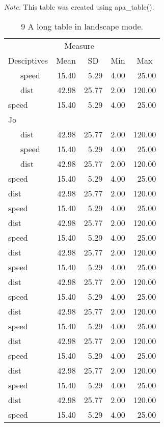 \documentclass[english,man]{apa6}
\makeatletter
\newenvironment{lltable}
  {\begin{landscape}\begin{center}\begin{ThreePartTable}}
  {\end{ThreePartTable}\end{center}\end{landscape}}
\newcommand\LastLTentrywidth{1em}
\newlength\longtablewidth
\newcommand\getlongtablewidth{%
 \begingroup
  \ifcsname LT@\roman{LT@tables}\endcsname
  \global\longtablewidth=0pt
  \renewcommand\LT@entry[2]{\global\advance\longtablewidth by ##2\relax\gdef\LastLTentrywidth{##2}}%
  \@nameuse{LT@\roman{LT@tables}}%
  \fi
\endgroup}
\theoremstyle{definition}
\theoremstyle{definition}
\theoremstyle{definition}
\theoremstyle{remark}
\makeatother
\begin{document}
\begin{lltable}
\begin{TableNotes}[para]
\textit{Note.} This table was created using apa\_table().
\end{TableNotes}
\begin{longtable}{lrrlr}\noalign{\getlongtablewidth\global\LTcapwidth=\longtablewidth}
\caption{\label{tab:unnamed-chunk-8}9 A long table in landscape mode.}\\
\toprule
 & \multicolumn{2}{c}{Measure}  &  &\\
\cmidrule(r){2-3}
Desciptives & \multicolumn{1}{c}{Mean} & \multicolumn{1}{c}{SD} & \multicolumn{1}{c}{Min} & \multicolumn{1}{c}{Max}\\
\midrule
\ \ \ speed & 15.40 & 5.29 & 4.00 & 25.00\\
\ \ \ dist & 42.98 & 25.77 & 2.00 & 120.00\\
speed & 15.40 & 5.29 & 4.00 & 25.00\\
Jo &  &  &  & \\ \midrule
\ \ \ dist & 42.98 & 25.77 & 2.00 & 120.00\\
\ \ \ speed & 15.40 & 5.29 & 4.00 & 25.00\\
\ \ \ dist & 42.98 & 25.77 & 2.00 & 120.00\\
speed & 15.40 & 5.29 & 4.00 & 25.00\\
dist & 42.98 & 25.77 & 2.00 & 120.00\\
speed & 15.40 & 5.29 & 4.00 & 25.00\\
dist & 42.98 & 25.77 & 2.00 & 120.00\\
speed & 15.40 & 5.29 & 4.00 & 25.00\\
dist & 42.98 & 25.77 & 2.00 & 120.00\\
speed & 15.40 & 5.29 & 4.00 & 25.00\\
dist & 42.98 & 25.77 & 2.00 & 120.00\\
speed & 15.40 & 5.29 & 4.00 & 25.00\\
dist & 42.98 & 25.77 & 2.00 & 120.00\\
speed & 15.40 & 5.29 & 4.00 & 25.00\\
dist & 42.98 & 25.77 & 2.00 & 120.00\\
speed & 15.40 & 5.29 & 4.00 & 25.00\\
dist & 42.98 & 25.77 & 2.00 & 120.00\\
speed & 15.40 & 5.29 & 4.00 & 25.00\\
dist & 42.98 & 25.77 & 2.00 & 120.00\\
speed & 15.40 & 5.29 & 4.00 & 25.00\\

\end{longtable}
\end{lltable}
\end{document}
